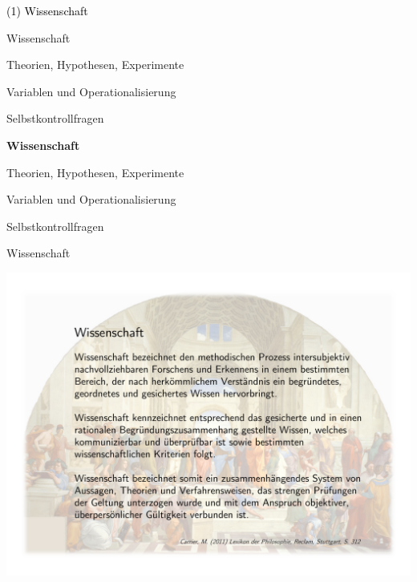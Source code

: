 \documentclass[
  8pt,
  ignorenonframetext,
]{beamer}
\begin{document}
\begin{frame}[plain]{}
\protect\hypertarget{section-1}{}
\vfill
\center
\huge

\textcolor{black}{(1) Wissenschaft} \vfill
\end{frame}

\begin{frame}{}
\protect\hypertarget{section-2}{}
\vfill
{}
\Large

Wissenschaft

Theorien, Hypothesen, Experimente

Variablen und Operationalisierung

Selbstkontrollfragen
\end{frame}

\begin{frame}{}
\protect\hypertarget{section-3}{}
\vfill
{}
\Large

\textbf{Wissenschaft}

Theorien, Hypothesen, Experimente

Variablen und Operationalisierung

Selbstkontrollfragen
\end{frame}

\begin{frame}{Wissenschaft}
\protect\hypertarget{wissenschaft}{}
\begin{center}\includegraphics[width=1\linewidth]{1_Abbildungen/pfm_1_wissenschaft_definition} \end{center}
\end{frame}
\end{document}
